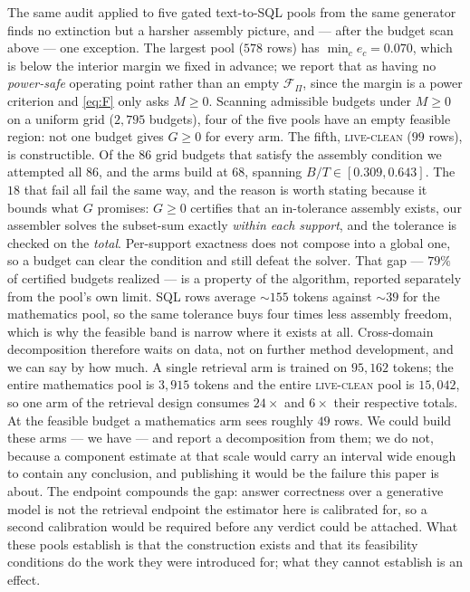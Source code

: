 \documentclass[10pt,twocolumn]{article}
\begin{document}
The same audit applied to five gated text-to-SQL pools from the same generator finds no
extinction but a harsher assembly picture, and --- after the budget scan above --- one
exception. The largest pool ($578$ rows) has $\min_c e_c = 0.070$, which is below the interior
margin we fixed in advance; we report that as having no \emph{power-safe} operating point rather
than an empty $\mathcal{F}_\Pi$, since the margin is a power criterion and \eqref{eq:F} only
asks $M\ge0$. Scanning admissible budgets under $M\ge0$ on a uniform grid ($2{,}795$ budgets), four of the five
pools have an empty feasible region: not one budget gives $G\ge0$ for every arm. The fifth,
\textsc{live-clean} ($99$ rows), is constructible. Of the $86$ grid budgets that satisfy the
assembly condition we attempted all $86$, and the arms build at $68$, spanning
$B/T\in[0.309,0.643]$. The $18$ that fail all fail the same way, and the reason is worth stating
because it bounds what $G$ promises: $G\ge0$ certifies that an in-tolerance assembly exists, our
assembler solves the subset-sum exactly \emph{within each support}, and the tolerance is checked
on the \emph{total}. Per-support exactness does not compose into a global one, so a budget can
clear the condition and still defeat the solver. That gap --- $79\%$ of certified budgets
realized --- is a property of the algorithm, reported separately from the pool's own limit. SQL rows average $\sim\!155$ tokens
against $\sim\!39$ for the mathematics pool, so the same tolerance buys four times less assembly
freedom, which is why the feasible band is narrow where it exists at all. Cross-domain
decomposition therefore waits on data, not on further method development, and we can say by how
much. A single retrieval arm is trained on $95{,}162$ tokens; the entire mathematics pool is
$3{,}915$ tokens and the entire \textsc{live-clean} pool is $15{,}042$, so one arm of the
retrieval design consumes $24\times$ and $6\times$ their respective totals. At the feasible
budget a mathematics arm sees roughly $49$ rows. We could build these arms --- we have --- and
report a decomposition from them; we do not, because a component estimate at that scale would
carry an interval wide enough to contain any conclusion, and publishing it would be the
failure this paper is about. The endpoint compounds the gap: answer correctness over a
generative model is not the retrieval endpoint the estimator here is calibrated for, so a second
calibration would be required before any verdict could be attached. What these pools establish
is that the construction exists and that its feasibility conditions do the work they were
introduced for; what they cannot establish is an effect.
\end{document}
